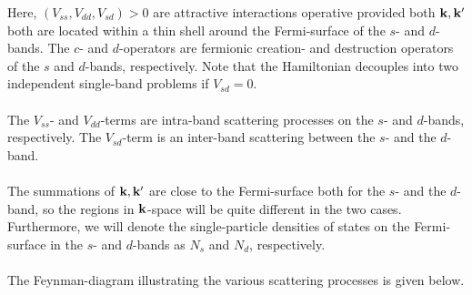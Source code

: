 \documentclass{article}
\begin{document}
Here, $(V_{ss}, V_{dd}, V_{sd})>0$ are attractive interactions operative provided both ${\bf k},{\bf k}^{\prime}$ both are located within a thin shell around the Fermi-surface of the $s$- and $d$-bands. The $c$- and  $d$-operators are fermionic creation- and destruction operators of the $s$ and $d$-bands,  respectively. Note that the Hamiltonian decouples into two independent single-band problems if $V_{sd}=0$.
\ \\
\ \\
The $V_{ss}$- and $V_{dd}$-terms are intra-band scattering processes on the $s$- and $d$-bands, respectively. The $V_{sd}$-term is an inter-band scattering between the $s$- and the $d$-band. 
\ \\
\ \\
The summations of ${\bf k},{\bf k}^{\prime}$
are close to the Fermi-surface both for the $s$- and the $d$-band, so the regions in ${\bf k}$-space will be quite different in the two cases. Furthermore, we will denote the single-particle densities of states on the Fermi-surface in the $s$- and $d$-bands as $N_s$ and $N_d$, respectively. 
\ \\
\ \\
The Feynman-diagram illustrating the various scattering processes is given below. 
\vskip 1.0cm
\end{document}
